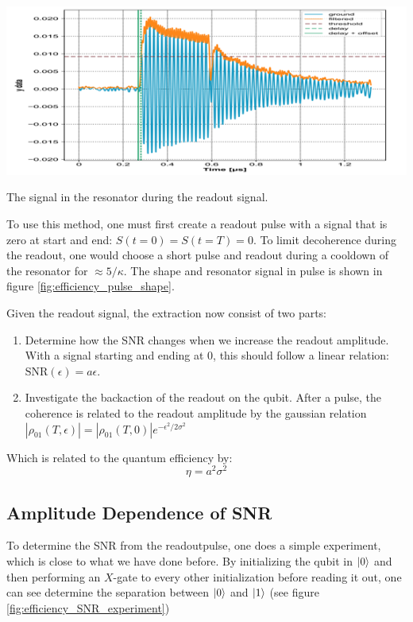 \begin{marginfigure}
    \centering
    \includegraphics{Figs/calibrations/efficiency/pulse_shape.png}
    \caption{The signal in the resonator during the readout signal.}
    \label{fig:efficiency_pulse_shape}
\end{marginfigure}

To use this method, one must first create a readout pulse with a signal that is zero at start and end: $S(t = 0) = S(t = T) = 0$. To limit decoherence during the readout, one would choose a short pulse and readout during a cooldown of the resonator for $\approx 5 / \kappa$. The shape and resonator signal in pulse is shown in figure \ref{fig:efficiency_pulse_shape}. 

Given the readout signal, the extraction now consist of two parts:
\begin{enumerate}
    \item Determine how the SNR changes when we increase the readout amplitude. With a signal starting and ending at 0, this should follow a linear relation: $\text{SNR}(\epsilon) = a \epsilon$.
    \item Investigate the backaction of the readout on the qubit. After a pulse, the coherence is related to the readout amplitude by the gaussian relation $|\rho_{01}(T, \epsilon)| = |\rho_{01}(T, 0)|e^{-\epsilon^2/2\sigma^2}$
\end{enumerate}

Which is related to the quantum efficiency by\cite{boltink}:
\begin{equation}
    \eta = a^2\sigma^2
\end{equation}

\subsection{Amplitude Dependence of SNR}
To determine the SNR from the readoutpulse, one does a simple experiment, which is close to what we have done before.  By initializing the qubit in $\ket{0}$ and then performing an $X$-gate to every other initialization before reading it out, one can see determine the separation between $\ket{0}$ and $\ket{1}$ (see figure \ref{fig:efficiency_SNR_experiment})

